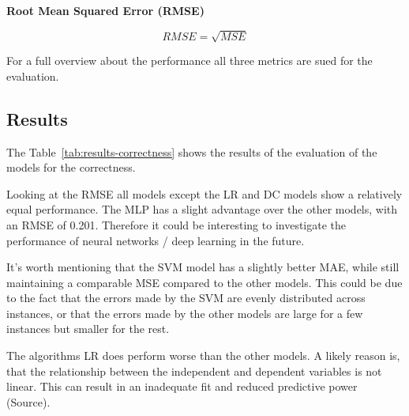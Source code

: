 \textbf{Root Mean Squared Error (RMSE)}

\begin{tcolorbox}[arc=0pt,boxrule=0.5pt]
    \begin{equation}
        \label{eq:rmse}
        RMSE = \sqrt{MSE}
    \end{equation}
\end{tcolorbox}

For a full overview about the performance all three metrics are sued for the
evaluation.




\subsection{Results}\label{subsec:results}
The Table~\ref{tab:results-correctness} shows the results of the
evaluation of the models for the correctness.

Looking at the \ac{RMSE} all models except the \ac{LR} and \ac{DC} models show a
relatively equal performance.
The \ac{MLP} has a slight advantage over the other models, with an \ac{RMSE} of 0.201.
Therefore it could be interesting to investigate the performance of neural networks /
deep learning in the future.

It's worth mentioning that the \ac{SVM} model has a slightly better \ac{MAE}, while
still maintaining a comparable \ac{MSE} compared to the other models.
This could be due to the fact that the errors made by the \ac{SVM} are evenly
distributed across instances, or that the errors made by the other models are large for
a few instances but smaller for the rest.

The algorithms \ac{LR} does perform worse than the other models.
A likely reason is, that the relationship between the independent and dependent
variables is not linear.
This can result in an inadequate fit and reduced predictive power (Source).

